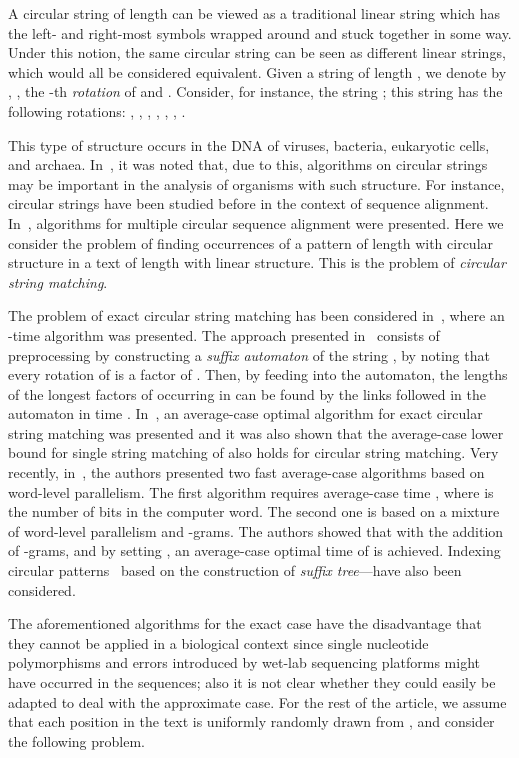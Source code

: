 \documentclass[runningheads, envcountsame, a4paper]{llncs}\usepackage{etex}
\begin{document}
A circular string of length  can be viewed as a traditional linear string which has the left- and right-most symbols 
wrapped around and stuck together in some way. Under this notion, the same circular string can be seen as  different 
linear strings, which would all be considered equivalent. Given a string  of length , we denote 
by , , the -th \textit{rotation} of  and .
Consider, for instance, the string ; this string has the following rotations:
, , , , 
, , .

This type of structure occurs in the DNA of viruses, bacteria, 
eukaryotic cells, and archaea. In~\cite{G97}, it was noted that, due to this, algorithms on 
circular strings may be important in the analysis of organisms with such structure. For instance, circular strings have been studied before 
in the context of sequence alignment. In~\cite{Lee:2010:FOA:1875737.1875765,circ09}, algorithms for multiple circular 
sequence alignment were presented. Here we consider the problem of finding occurrences of a pattern  of length  with circular structure 
in a text  of length  with linear structure. 
This is the problem of \emph{circular string matching}.

The problem of exact circular string matching has been considered in~\cite{Lot05}, where an -time algorithm was presented. 
The approach presented in~\cite{Lot05} consists of preprocessing  by constructing 
a \emph{suffix automaton} of the string , by noting that every rotation of  is a factor of . 
Then, by feeding  into the automaton, the lengths of the longest factors of  occurring in  can be found 
by the links followed in the automaton in time . 
In~\cite{Grabowski}, an average-case optimal algorithm for exact circular string matching was presented and it was also shown that the average-case lower bound for single string matching of  also holds 
for circular string matching. Very recently, in~\cite{Chen03032013}, the authors presented two fast average-case algorithms 
based on word-level parallelism. The first algorithm requires average-case time , where  is the 
number of bits in the computer word. The second one is based on a mixture of word-level parallelism and -grams. 
The authors showed that with the addition of -grams, and by setting , an average-case optimal time 
of  is achieved.  
Indexing circular patterns~\cite{Iliopoulos:2008:ICP:1787651.1787658} based on the construction of \emph{suffix tree}---have also been considered. 

The aforementioned algorithms for the exact case have the disadvantage that
they cannot be applied in a biological context since single nucleotide polymorphisms and errors introduced 
by wet-lab sequencing platforms might have occurred in the sequences; also it is not clear whether they could easily be adapted to deal with the approximate case. 
For the rest of the article, we assume that each position in the text  is uniformly randomly drawn from , 
and consider the following problem.
\end{document}
